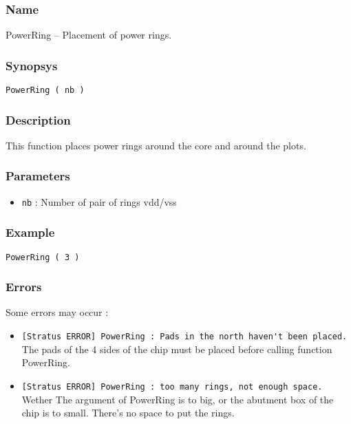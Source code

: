 \subsubsection{Name}

PowerRing -- Placement of power rings.

\subsubsection{Synopsys}

\begin{verbatim}
PowerRing ( nb )
\end{verbatim}

\subsubsection{Description}

This function places power rings around the core and around the plots.
    
\subsubsection{Parameters}

\begin{itemize}
    \item \verb-nb- : Number of pair of rings vdd/vss 
\end{itemize}
    
\subsubsection{Example}

\begin{verbatim}
PowerRing ( 3 )
\end{verbatim}

\subsubsection{Errors}
    
Some errors may occur :
\begin{itemize}
    \item \verb-[Stratus ERROR] PowerRing : Pads in the north haven't been placed.-\\The pads of the 4 sides of the chip must be placed before calling function PowerRing.
    \item \verb-[Stratus ERROR] PowerRing : too many rings, not enough space.-\\Wether The argument of PowerRing is to big,  or the abutment box of the chip is to small. There's no space to put the rings.
\end{itemize}
         
